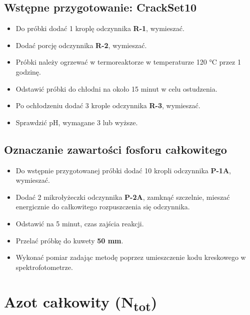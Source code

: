 \documentclass[
  letterpaper,
  DIV=11,
  numbers=noendperiod]{scrreprt}
\begin{document}
\hypertarget{wstux119pne-przygotowanie-crackset10}{%
\subsection{Wstępne przygotowanie:
CrackSet10}\label{wstux119pne-przygotowanie-crackset10}}

\begin{itemize}
\item
  Do próbki dodać 1 kroplę odczynnika \textbf{R-1}, wymieszać.
\item
  Dodać porcję odczynnika \textbf{R-2}, wymieszać.
\item
  Próbki należy ogrzewać w termoreaktorze w temperaturze 120 °C przez 1
  godzinę.
\item
  Odstawić próbki do chłodni na około 15 minut w celu ostudzenia.
\item
  Po ochłodzeniu dodać 3 krople odczynnika \textbf{R-3}, wymieszać.
\item
  Sprawdzić pH, wymagane 3 lub wyższe.
\end{itemize}

\hypertarget{oznaczanie-zawartoux15bci-fosforu-caux142kowitego}{%
\subsection{Oznaczanie zawartości fosforu
całkowitego}\label{oznaczanie-zawartoux15bci-fosforu-caux142kowitego}}

\begin{itemize}
\item
  Do wstępnie przygotowanej próbki dodać 10 kropli odczynnika
  \textbf{P-1A}, wymieszać.
\item
  Dodać 2 mikrołyżeczki odczynnika \textbf{P-2A}, zamknąć szczelnie,
  mieszać energicznie do całkowitego rozpuszczenia się odczynnika.
\item
  Odstawić na 5 minut, czas zajścia reakcji.
\item
  Przelać próbkę do kuwety \textbf{50 mm}.
\item
  Wykonać pomiar zadając metodę poprzez umieszczenie kodu kreskowego w
  spektrofotometrze.
\end{itemize}

\hypertarget{azot-caux142kowity-ntot}{%
\section{\texorpdfstring{Azot całkowity
(N\textsubscript{tot})}{Azot całkowity (Ntot)}}\label{azot-caux142kowity-ntot}}
\end{document}
